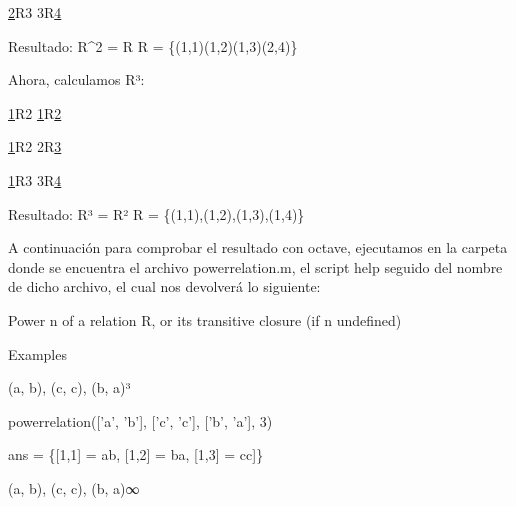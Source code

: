 \documentclass{article}
\begin{document}
\underline{2}R3 \rightarrow 3R\underline{4}

\vspace{4mm}

Resultado: R^2 = R \circ R = \{(1,1)(1,2)(1,3)(2,4)\}

\vspace{8mm}

\newpage

Ahora, calculamos R³:

\vspace{4mm}

\underline{1}R2 \rightarrow \underline{1}R\underline{2}

\vspace{1mm}

\underline{1}R2 \rightarrow 2R\underline{3}

\vspace{1mm}

\underline{1}R3 \rightarrow 3R\underline{4}

\vspace{4mm}

Resultado: R³ = R² \circ R = \{(1,1),(1,2),(1,3),(1,4)\}

\vspace{6mm}

A continuación para comprobar el resultado con octave, ejecutamos en la carpeta donde se encuentra el archivo powerrelation.m, el script help seguido del nombre de dicho archivo, el cual nos devolverá lo siguiente:

\vspace{4mm}

Power n of a relation R, or its transitive closure (if n undefined)

\vspace{4mm}

Examples

\vspace{3mm}

   {(a, b), (c, c), (b, a)}³
   
\vspace{1mm}
   
powerrelation({['a', 'b'], ['c', 'c'], ['b', 'a']}, 3)
   
\vspace{1mm}

ans = \{[1,1] = ab, [1,2] = ba, [1,3] = cc]\}
    
\vspace{5mm}

(a, b), (c, c), (b, a)∞
   
\end{document}
